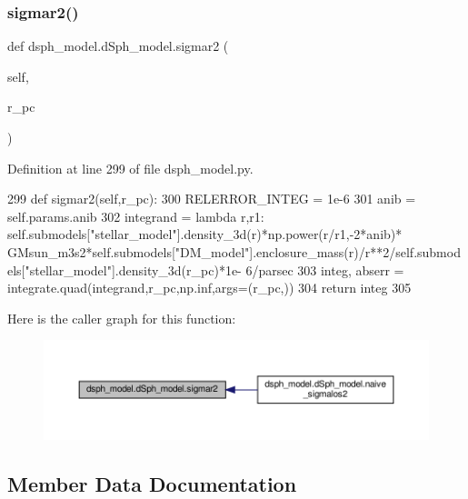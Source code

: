\subsubsection{\texorpdfstring{sigmar2()}{sigmar2()}}
{\footnotesize\ttfamily def dsph\+\_\+model.\+d\+Sph\+\_\+model.\+sigmar2 (\begin{DoxyParamCaption}\item[{}]{self,  }\item[{}]{r\+\_\+pc }\end{DoxyParamCaption})}



Definition at line 299 of file dsph\+\_\+model.\+py.


\begin{DoxyCode}
299     \textcolor{keyword}{def }sigmar2(self,r\_pc):
300         RELERROR\_INTEG = 1e-6
301         anib = self.params.anib
302         integrand = \textcolor{keyword}{lambda} r,r1: self.submodels[\textcolor{stringliteral}{"stellar\_model"}].density\_3d(r)*np.power(r/r1,-2*anib)*
      GMsun\_m3s2*self.submodels[\textcolor{stringliteral}{"DM\_model"}].enclosure\_mass(r)/r**2/self.submodels[\textcolor{stringliteral}{"stellar\_model"}].density\_3d(r\_pc)*1e-
      6/parsec
303         integ, abserr = integrate.quad(integrand,r\_pc,np.inf,args=(r\_pc,))
304         \textcolor{keywordflow}{return} integ
305     
\end{DoxyCode}
Here is the caller graph for this function\+:
\nopagebreak
\begin{figure}[H]
\begin{center}
\leavevmode
\includegraphics[width=350pt]{d0/d25/classdsph__model_1_1dSph__model_a1c6185c02a3f58951b7ed9b75a348f49_icgraph}
\end{center}
\end{figure}


\subsection{Member Data Documentation}
\mbox{\label{classdsph__model_1_1dSph__model_a44e4805fa7304536056b19bd361c3d37}} 
